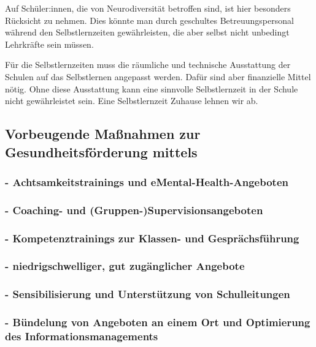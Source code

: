 \documentclass[DIV=calc]{scrartcl}
\begin{document}
Auf Schüler:innen, die von Neurodiversität betroffen sind, ist hier besonders Rücksicht zu nehmen. Dies könnte man durch geschultes Betreuungspersonal während den Selbstlernzeiten gewährleisten, die aber selbst nicht unbedingt Lehrkräfte sein müssen.

Für die Selbstlernzeiten muss die räumliche und technische Ausstattung der Schulen auf das Selbstlernen angepasst werden. Dafür sind aber finanzielle Mittel nötig. Ohne diese Ausstattung kann eine sinnvolle Selbstlernzeit in der Schule nicht gewährleistet sein. Eine Selbstlernzeit Zuhause lehnen wir ab.

\subsection*{Vorbeugende Maßnahmen zur Gesundheitsförderung mittels}
\subsubsection*{- Achtsamkeitstrainings und eMental-Health-Angeboten}
\subsubsection*{- Coaching- und (Gruppen-)Supervisionsangeboten}
\subsubsection*{- Kompetenztrainings zur Klassen- und Gesprächsführung}
\subsubsection*{- niedrigschwelliger, gut zugänglicher Angebote}
\subsubsection*{- Sensibilisierung und Unterstützung von Schulleitungen}
\subsubsection*{- Bündelung von Angeboten an einem Ort und Optimierung des Informationsmanagements}

\end{document}
